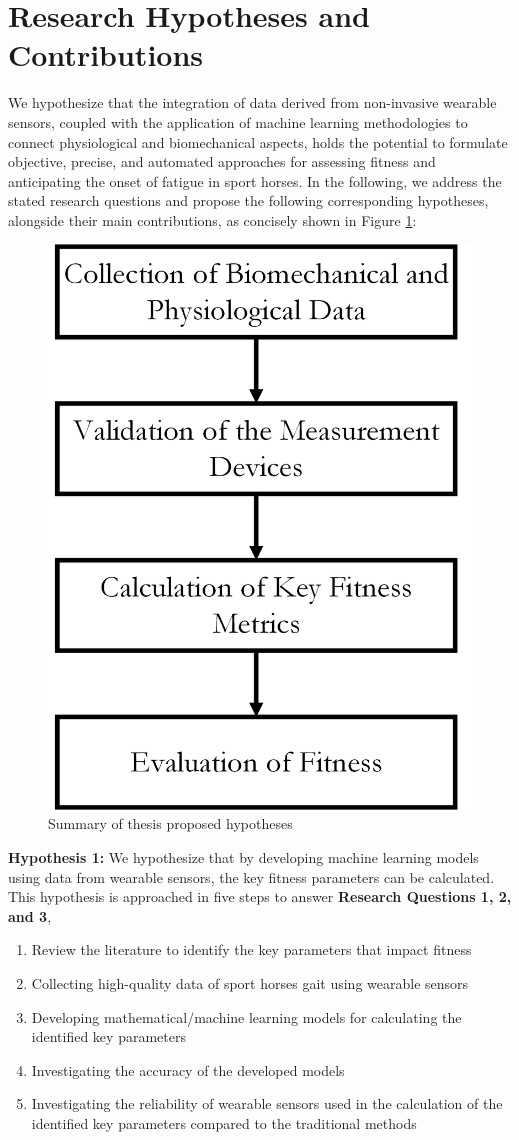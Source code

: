 \section{Research Hypotheses and Contributions}
\label{sec:hypotheses}

We hypothesize that the integration of data derived from non-invasive wearable sensors, coupled with the application of machine learning methodologies to connect physiological and biomechanical aspects, holds the potential to formulate objective, precise, and automated approaches for assessing fitness and anticipating the onset of fatigue in sport horses. In the following, we address the stated research questions and propose the following corresponding hypotheses, alongside their main contributions, as concisely shown in Figure \ref{fig:summary}:

\begin{figure}[htb]
\centering
\includegraphics[width=.35\linewidth]{../tables/Naamloos.png}
\caption{Summary of thesis proposed hypotheses}
\label{fig:summary}
\end{figure}

\vspace{0.25cm}

\noindent\textbf{\large Hypothesis 1:} We hypothesize that by developing machine learning models using data from wearable sensors, the key fitness parameters can be calculated. This hypothesis is approached in five steps to answer \textbf{Research Questions 1, 2, and 3},

    \begin{enumerate}
        \item Review the literature to identify the key parameters that impact fitness
\item Collecting high-quality data of sport horses gait using wearable sensors
\item Developing mathematical/machine learning models for calculating the identified key parameters
\item Investigating the accuracy of the developed models
\item Investigating the reliability of wearable sensors used in the calculation of the identified key parameters compared to the traditional methods
    \end{enumerate} 

